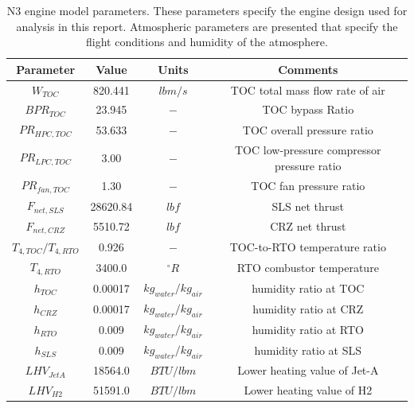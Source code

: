 \documentclass[conf]{new-aiaa}
\begin{document}
\begin{table}[hbt!]
    \centering
    \caption{
        N3 engine model parameters.
        These parameters specify the engine design used for analysis in this report.
        Atmospheric parameters are presented that specify the flight conditions and humidity of the atmosphere.}
    \begin{tabular}{c c c c}
        \hline
        Parameter             & Value    & Units                 & Comments                                   \\
        \hline
        $W_{TOC}$             & 820.441  & $lbm/s$               & TOC total mass flow rate of air            \\
        $BPR_{TOC}$           & 23.945   & $-$                   & TOC bypass Ratio                           \\
        $PR_{HPC,TOC}$        & 53.633   & $-$                   & TOC overall pressure ratio                 \\
        $PR_{LPC,TOC}$        & 3.00     & $-$                   & TOC low-pressure compressor pressure ratio \\
        $PR_{fan,TOC}$        & 1.30     & $-$                   & TOC fan pressure ratio                     \\
        $F_{net,SLS}$         & 28620.84 & $lbf$                 & SLS net thrust                             \\
        $F_{net,CRZ}$         & 5510.72  & $lbf$                 & CRZ net thrust                             \\
        $T_{4,TOC}/T_{4,RTO}$ & 0.926    & $-$                   & TOC-to-RTO temperature ratio               \\
        $T_{4,RTO}$           & 3400.0   & $^{\circ}R$           & RTO combustor temperature                  \\
        $h_{TOC}$             & 0.00017  & $kg_{water}/kg_{air}$ & humidity ratio at TOC \cite{Kalnay1996}    \\
        $h_{CRZ}$             & 0.00017  & $kg_{water}/kg_{air}$ & humidity ratio at CRZ \cite{Kalnay1996}    \\
        $h_{RTO}$             & 0.009    & $kg_{water}/kg_{air}$ & humidity ratio at RTO \cite{Kalnay1996}    \\
        $h_{SLS}$             & 0.009    & $kg_{water}/kg_{air}$ & humidity ratio at SLS \cite{Kalnay1996}    \\
        $LHV_{JetA}$          & 18564.0  & $BTU/lbm$             & Lower heating value of Jet-A               \\
        $LHV_{H2}$            & 51591.0  & $BTU/lbm$             & Lower heating value of H2                  \\
        \hline
    \end{tabular}
    \label{engine_params}
\end{table}
\end{document}
